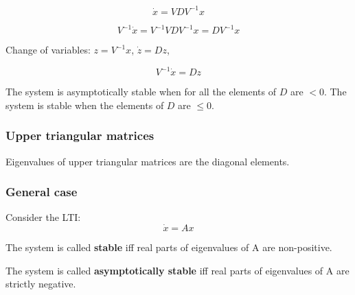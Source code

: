 \[
\dot{x} = VDV^{-1}x
\]

\[
V^{-1}\dot{x} = V^{-1}VDV^{-1}x = DV^{-1}x
\]

Change of variables: \(z = V^{-1}x\), \(\dot{z} = Dz\), 

\[
V^{-1}\dot{x} = Dz
\]

The system is asymptotically stable when for all the elements of \(D\) are \( < 0\). 
The system is stable when the elements of \(D\) are \(\leq 0\).  

\subsubsection{Upper triangular matrices}

\begin{tcolorbox}[colback=white]
    Eigenvalues of upper triangular matrices are the diagonal elements.
\end{tcolorbox}
    

\subsubsection{General case}

Consider the LTI:
\[\dot x = Ax\]

\begin{tcolorbox}[colback=green!10,colframe=green!50!black]
    The system is called \textbf{stable} iff real parts of eigenvalues of A are non-positive.
\end{tcolorbox}

\begin{tcolorbox}[colback=green!10,colframe=green!50!black]
    The system is called \textbf{asymptotically stable} iff real parts of eigenvalues of A are  strictly negative. 
\end{tcolorbox}